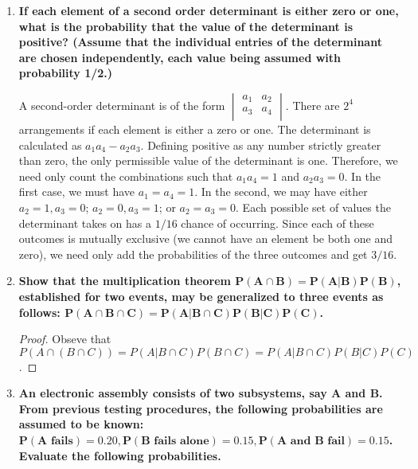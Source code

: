 \documentclass[10pt, oneside]{article}   	%
\theoremstyle{definition}
\begin{document}
\begin{enumerate}[label=3.\arabic*]
\item  \begin{tcolorbox}[
  colback=Cerulean!5!white,
  colframe=Cerulean!75!black]
\textbf{If each element of a second order determinant is either zero or one, what is the probability that the value of the determinant is positive? (Assume that the individual entries of the determinant are chosen independently, each value being assumed with probability 1/2.)}
\end{tcolorbox}

A second-order determinant is of the form $   \begin{vmatrix} %
      a_1 & a_2 \\
      a_3 & a_4 \\
   \end{vmatrix}$. There are $2^4$ arrangements if each element is either a zero or one. The determinant is calculated as $a_1 a_4 - a_2 a_3$. Defining positive as any number strictly greater than zero, the only permissible value of the determinant is one. Therefore, we need only count the combinations such that $a_1 a_4 = 1$ and $a_2 a_3 = 0$. In the first case, we must have $a_1 = a_4 = 1$. In the second, we may have either $a_2 = 1, a_3 = 0$; $a_2 = 0, a_3 = 1$; or $a_2 = a_3 = 0$. Each possible set of values the determinant takes on has a $1/16$ chance of occurring. Since each of these outcomes is mutually exclusive (we cannot have an element be both one and zero), we need only add the probabilities of the three outcomes and get $\boxed{3/16}$.
   
\item  \begin{tcolorbox}[
  colback=Cerulean!5!white,
  colframe=Cerulean!75!black]
\textbf{Show that the multiplication theorem $\bm{P(A \cap B) = P(A | B) P(B)}$, established for two events, may be generalized to three events as follows: $\bm{P(A \cap B \cap C) = P(A | B \cap C) P(B | C) P(C)}$.}
\end{tcolorbox}

\begin{proof} Obseve that $P(A \cap (B \cap C)) = P(A | B \cap C) P(B \cap C) = P(A | B \cap C) P(B | C) P(C)$.
\end{proof}

\item  \begin{tcolorbox}[
  colback=Cerulean!5!white,
  colframe=Cerulean!75!black]
\textbf{An electronic assembly consists of two subsystems, say $\bm{A}$ and $\bm{B}$. From previous testing procedures, the following probabilities are assumed to be known: $\bm{P(A \text{ fails}) = 0.20, P(B \text{ fails alone}) = 0.15, P(A \text{ and } B \text{ fail}) = 0.15}$. Evaluate the following probabilities.}
\end{tcolorbox}


\end{enumerate}
\end{document}
